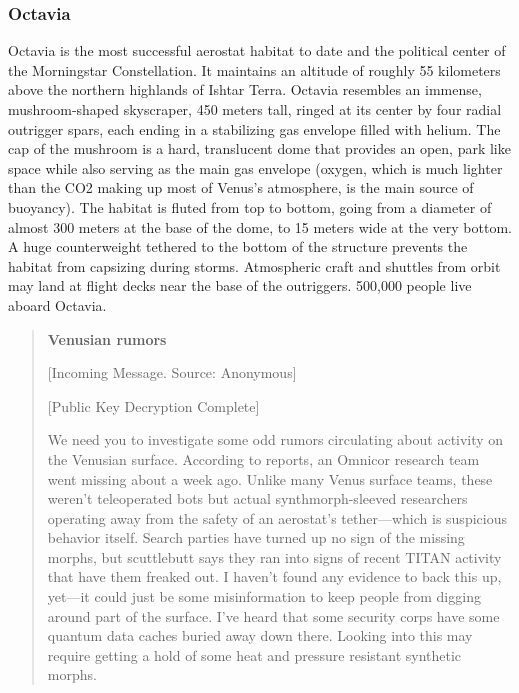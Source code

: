\subsubsection{Octavia}
\label{sec:octavia}

Octavia is the most successful aerostat habitat to date and the
political center of the Morningstar Constellation. It maintains an
altitude of roughly 55 kilometers above the northern highlands of
Ishtar Terra. Octavia resembles an immense, mushroom-shaped
skyscraper, 450 meters tall, ringed at its center by four radial
outrigger spars, each ending in a stabilizing gas envelope filled with
helium. The cap of the mushroom is a hard, translucent dome that
provides an open, park like space while also serving as the main gas
envelope (oxygen, which is much lighter than the CO2 making up most of
Venus's atmosphere, is the main source of buoyancy). The habitat is
fluted from top to bottom, going from a diameter of almost 300 meters
at the base of the dome, to 15 meters wide at the very bottom. A huge
counterweight tethered to the bottom of the structure prevents the
habitat from capsizing during storms. Atmospheric craft and shuttles
from orbit may land at flight decks near the base of the
outriggers. 500,000 people live aboard Octavia.

\begin{quotation}
  \textbf{Venusian rumors}

  [Incoming Message. Source: Anonymous]

  [Public Key Decryption Complete]
  
  We need you to investigate some odd rumors circulating about
  activity on the Venusian surface. According to reports, an Omnicor
  research team went missing about a week ago. Unlike many Venus
  surface teams, these weren't teleoperated bots but actual
  synthmorph-sleeved researchers operating away from the safety of an
  aerostat's tether—which is suspicious behavior itself. Search
  parties have turned up no sign of the missing morphs, but
  scuttlebutt says they ran into signs of recent TITAN activity that
  have them freaked out. I haven't found any evidence to back this up,
  yet—it could just be some misinformation to keep people from digging
  around part of the surface. I've heard that some security corps have
  some quantum data caches buried away down there. Looking into this
  may require getting a hold of some heat and pressure resistant
  synthetic morphs.
\end{quotation}

